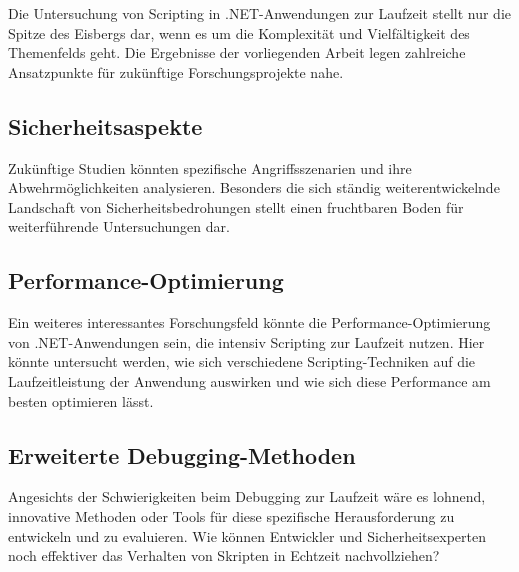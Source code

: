 Die Untersuchung von Scripting in .NET-Anwendungen zur Laufzeit stellt nur die Spitze des 
Eisbergs dar, wenn es um die Komplexität und Vielfältigkeit des Themenfelds geht. 
Die Ergebnisse der vorliegenden Arbeit legen zahlreiche Ansatzpunkte für zukünftige 
Forschungsprojekte nahe.

\subsection*{Sicherheitsaspekte}

Zukünftige Studien könnten spezifische Angriffsszenarien und ihre Abwehrmöglichkeiten analysieren.
Besonders die sich ständig weiterentwickelnde Landschaft von Sicherheitsbedrohungen 
stellt einen fruchtbaren Boden für weiterführende Untersuchungen dar.

\subsection*{Performance-Optimierung}

Ein weiteres interessantes Forschungsfeld könnte die Performance-Optimierung von 
.NET-Anwendungen sein, die intensiv Scripting zur Laufzeit nutzen. Hier könnte 
untersucht werden, wie sich verschiedene Scripting-Techniken auf die Laufzeitleistung 
der Anwendung auswirken und wie sich diese Performance am besten optimieren lässt.

\subsection*{Erweiterte Debugging-Methoden}

Angesichts der Schwierigkeiten beim Debugging zur Laufzeit wäre es lohnend, 
innovative Methoden oder Tools für diese spezifische Herausforderung zu entwickeln 
und zu evaluieren. Wie können Entwickler und Sicherheitsexperten noch effektiver das 
Verhalten von Skripten in Echtzeit nachvollziehen?